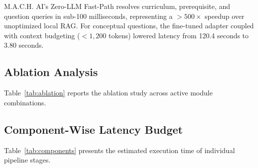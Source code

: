 \documentclass[conference]{IEEEtran}
\begin{document}
M.A.C.H. AI's Zero-LLM Fast-Path resolves curriculum, prerequisite, and question queries in sub-100 milliseconds, representing a $>500\times$ speedup over unoptimized local RAG. For conceptual questions, the fine-tuned adapter coupled with context budgeting ($<1,200$ tokens) lowered latency from 120.4 seconds to 3.80 seconds.

\subsection{Ablation Analysis}
Table~\ref{tab:ablation} reports the ablation study across active module combinations.

\begin{table}[htbp]
\caption{Ablation Study across Active M.A.C.H. AI Module Combinations}
\label{tab:ablation}
\centering
{}
\end{table}

\subsection{Component-Wise Latency Budget}
Table~\ref{tab:components} presents the estimated execution time of individual pipeline stages.
\end{document}
